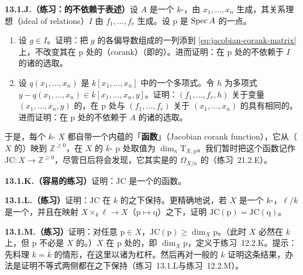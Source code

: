 \textbf{13.1.J.（练习：\trJacobianMatrix{}的\trCorank{}不依赖于表述）}\quad 设 $A$ 是一个\trFinitelyGenerated{} $k$-\trAlgebra，由 $x_1,\dots,x_n$ 生成，其关系理想（ideal of relations）$I$ 由 $f_1,\dots,f_r$ 生成。设 $\mathrm{p}$ 是 $\operatorname{Spec} A$ 的一点。
\begin{enumerate}[label=(\alph*)]
\item 设 $g\in I$。证明：把 $g$ 的各偏导数组成的一列添到\trJacobianMatrix{} \eqref{eq:jacobian-corank-matrix} 上，不改变其在 $\mathrm{p}$ 处的\textbf{\trCorank}（corank）（即\trCokernel{}的\trDimension）。进而证明：\trJacobianMatrix{}在 $\mathrm{p}$ 处的\trCorank{}不依赖于 $I$ 的诸\trGenerator{}的选取。
\item 设 $q(x_1,\dots,x_n)$ 是 $k[x_1,\dots,x_n]$ 中的一个多项式。令 $h$ 为多项式 $y-q(x_1,\dots,x_n)\in k[x_1,\dots,x_n,y]$。证明：$(f_1,\dots,f_r,h)$ 关于变量 $(x_1,\dots,x_n,y)$ 的\trJacobianMatrix，在 $\mathrm{p}$ 处与 $(f_1,\dots,f_r)$ 关于 $(x_1,\dots,x_n)$ 的\trJacobianMatrix{}具有相同的\trCorank。进而证明：\trJacobianMatrix{}在 $\mathrm{p}$ 处的\trCorank{}不依赖于 $A$ 的诸\trGenerator{}的选取。
\end{enumerate}
于是，每个\trFiniteType{} $k$-\trScheme{} $X$ 都自带一个内蕴的「\textbf{\trJacobianMatrix{}\trCorank{}函数}」（Jacobian corank function），它从（$X$ 的\trUnderlyingSet{}）映到 $\mathbb{Z}^{\ge0}$，在 $X$ 的 $k$-\trValuedPoint{} $\mathrm{p}$ 处取值为 $\dim_\kappa\mathrm{T}_{X,\mathrm{p}}$。我们暂时把这个函数记作 $\mathrm{JC}\colon X\to\mathbb{Z}^{\ge0}$，尽管日后将会发现，它其实是\trDifferential{}的\trCoherentSheaf{} $\Omega_{X/\kappa}$ 的\trRank（\mbox{练习~21.2.E}）。

\textbf{13.1.K.（容易的练习）}\quad 证明：$\mathrm{JC}$ 是一个\trUpperSemicontinuous{}的函数。

\textbf{13.1.L.（练习）}\quad 证明：$\mathrm{JC}$ 在 $k$ 的\trFieldExtension{}之下保持。更精确地说，若 $X$ 是一个\trFiniteType{} $k$-\trScheme，$\ell/k$ 是一个\trFieldExtension，并且在\trBaseChange{}映射 $X\times_k\ell\to X$（$\mathrm{p}\mapsto\mathrm{q}$）之下，证明 $\mathrm{JC}(\mathrm{p})=\mathrm{JC}(\mathrm{q})$。

\textbf{13.1.M.（练习）}\quad 证明：对任意 $\mathrm{p}\in X$，$\mathrm{JC}(\mathrm{p})\ge\dim_X\mathrm{p}$。（此时 $X$ 必然在 $k$ 上\trFiniteType，但 $\mathrm{p}$ 不必是 $X$ 的\trClosedPoint。）$X$ 在 $\mathrm{p}$ 处的\trDimension，即 $\dim_X\mathrm{p}$，定义于\mbox{练习~12.2.K}。提示：先料理 $k=\overline{k}$ 的情形，在这里以诸\trClosedPoint{}为杠杆。然后再对一般的 $k$ 证明这条结果，办法是证明不等式两侧都在\trFieldExtension{}之下保持（\mbox{练习~13.1.L}与\mbox{练习~12.2.M}）。

